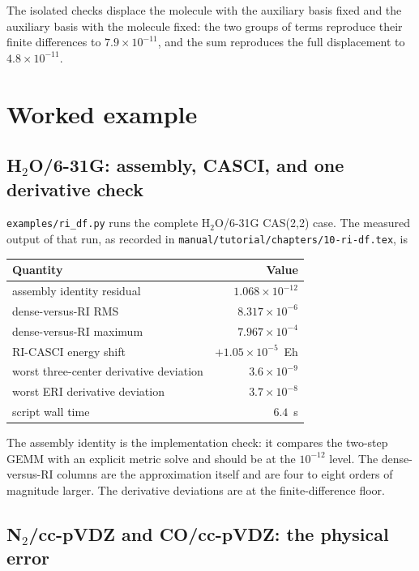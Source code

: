 The isolated checks displace the molecule with the auxiliary basis fixed
and the auxiliary basis with the molecule fixed: the two groups of terms
reproduce their finite differences to $7.9\times10^{-11}$, and the sum
reproduces the full displacement to $4.8\times10^{-11}$.

\section{Worked example}
\label{sec:ri-example}

\subsection{H\texorpdfstring{$_2$}{2}O/6-31G: assembly, CASCI, and one
derivative check}

\texttt{examples/ri\_df.py} runs the complete H$_2$O/6-31G CAS(2,2)
case.  The measured output of that run, as recorded in
\texttt{manual/tutorial/chapters/10-ri-df.tex}, is
\begin{center}
\small
\begin{tabular}{lr}
\toprule
Quantity & Value \\
\midrule
assembly identity residual & $1.068\times10^{-12}$ \\
dense-versus-RI RMS & $8.317\times10^{-6}$ \\
dense-versus-RI maximum & $7.967\times10^{-4}$ \\
RI-CASCI energy shift & $+1.05\times10^{-5}$~Eh \\
worst three-center derivative deviation & $3.6\times10^{-9}$ \\
worst ERI derivative deviation & $3.7\times10^{-8}$ \\
script wall time & $6.4$~s \\
\bottomrule
\end{tabular}
\end{center}
The assembly identity is the implementation check: it compares the
two-step GEMM with an explicit metric solve and should be at the
$10^{-12}$ level.  The dense-versus-RI columns are the approximation
itself and are four to eight orders of magnitude larger.  The
derivative deviations are at the finite-difference floor.

\subsection{N\texorpdfstring{$_2$}{2}/cc-pVDZ and CO/cc-pVDZ: the
physical error}


